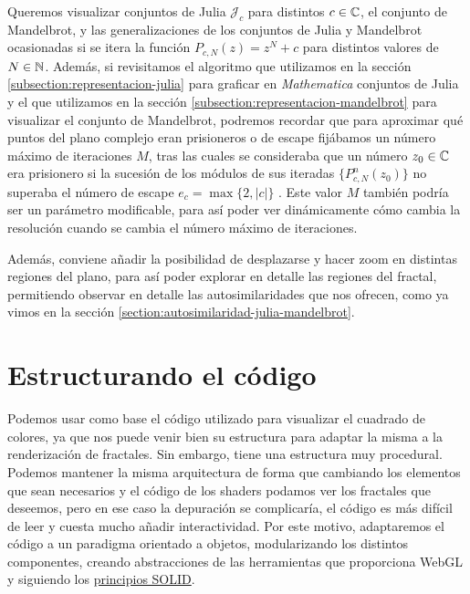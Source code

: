 Queremos visualizar conjuntos de Julia $\mathcal{J}_c$ para distintos $c\in\mathbb{C}$, el conjunto de Mandelbrot, y las generalizaciones de los conjuntos de Julia y Mandelbrot ocasionadas si se itera la función $P_{c,N}(z)=z^N+c$ para distintos valores de $N\in\mathbb{N}$. Además, si revisitamos el algoritmo que utilizamos en la sección \ref{subsection:representacion-julia} para graficar en \textit{Mathematica} conjuntos de Julia y el que utilizamos en la sección \ref{subsection:representacion-mandelbrot} para visualizar el conjunto de Mandelbrot, podremos recordar que para aproximar qué puntos del plano complejo eran prisioneros o de escape fijábamos un número máximo de iteraciones $M$, tras las cuales se consideraba que un número $z_0\in\mathbb{C}$ era prisionero si la sucesión de los módulos de sus iteradas $\{P_{c,N}^n(z_0)\}$ no superaba el número de escape $e_c=\max\{2,|c|\}$ . Este valor $M$ también podría ser un parámetro modificable, para así poder ver dinámicamente cómo cambia la resolución cuando se cambia el número máximo de iteraciones.

Además, conviene añadir la posibilidad de desplazarse y hacer zoom en distintas regiones del plano, para así poder explorar en detalle las regiones del fractal, permitiendo observar en detalle las autosimilaridades que nos ofrecen, como ya vimos en la sección \ref{section:autosimilaridad-julia-mandelbrot}. 


\section{Estructurando el código}
\label{section:codigo}

Podemos usar como base el código utilizado para visualizar el cuadrado de colores, ya que nos puede venir bien su estructura para adaptar la misma a la renderización de fractales. Sin embargo, tiene una estructura muy procedural. Podemos mantener la misma arquitectura de forma que cambiando los elementos que sean necesarios y el código de los shaders podamos ver los fractales que deseemos, pero en ese caso la depuración se complicaría, el código es más difícil de leer y cuesta mucho añadir interactividad. Por este motivo, adaptaremos el código a un paradigma orientado a objetos, modularizando los distintos componentes, creando abstracciones de las herramientas que proporciona WebGL y siguiendo los \href{https://medium.com/backticks-tildes/the-s-o-l-i-d-principles-in-pictures-b34ce2f1e898}{principios SOLID}.

